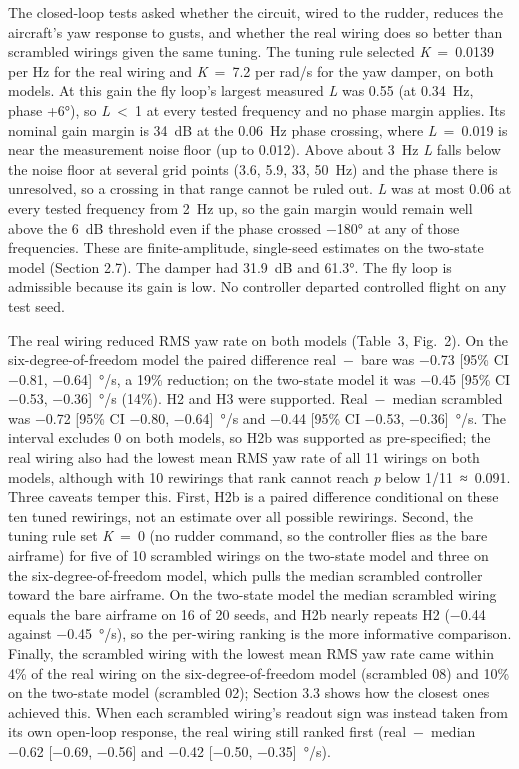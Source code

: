 \documentclass[11pt,letterpaper]{article}
\begin{document}
\noindent The closed-loop tests asked whether the circuit, wired to the
rudder, reduces the aircraft's yaw response to gusts, and whether the
real wiring does so better than scrambled wirings given the same tuning.
The tuning rule selected \emph{K}~=~0.0139 per Hz for the real wiring
and \emph{K}~=~7.2 per rad/s for the yaw damper, on both models. At this
gain the fly loop's largest measured \textbar{}\emph{L}\textbar{} was
0.55 (at 0.34~Hz, phase +6°), so \textbar{}\emph{L}\textbar~\textless~1
at every tested frequency and no phase margin applies. Its nominal gain
margin is 34~dB at the 0.06~Hz phase crossing, where
\textbar{}\emph{L}\textbar~=~0.019 is near the measurement noise floor
(up to 0.012). Above about 3~Hz \textbar{}\emph{L}\textbar{} falls below
the noise floor at several grid points (3.6, 5.9, 33, 50~Hz) and the
phase there is unresolved, so a crossing in that range cannot be ruled
out. \textbar{}\emph{L}\textbar{} was at most 0.06 at every tested
frequency from 2~Hz up, so the gain margin would remain well above the
6~dB threshold even if the phase crossed −180° at any of those
frequencies. These are finite-amplitude, single-seed estimates on the
two-state model (Section 2.7). The damper had 31.9~dB and 61.3°. The fly
loop is admissible because its gain is low. No controller departed
controlled flight on any test seed.

The real wiring reduced RMS yaw rate on both models (Table~3, Fig.~2).
On the six-degree-of-freedom model the paired difference real~−~bare was
−0.73 {[}95\% CI −0.81, −0.64{]}~°/s, a 19\% reduction; on the two-state
model it was −0.45 {[}95\% CI −0.53, −0.36{]}~°/s (14\%). H2 and H3 were
supported. Real~−~median scrambled was −0.72 {[}95\% CI −0.80,
−0.64{]}~°/s and −0.44 {[}95\% CI −0.53, −0.36{]}~°/s. The interval
excludes 0 on both models, so H2b was supported as pre-specified; the
real wiring also had the lowest mean RMS yaw rate of all 11 wirings on
both models, although with 10 rewirings that rank cannot reach \emph{p}
below 1/11~≈~0.091. Three caveats temper this. First, H2b is a paired
difference conditional on these ten tuned rewirings, not an estimate
over all possible rewirings. Second, the tuning rule set \emph{K}~=~0
(no rudder command, so the controller flies as the bare airframe) for
five of 10 scrambled wirings on the two-state model and three on the
six-degree-of-freedom model, which pulls the median scrambled controller
toward the bare airframe. On the two-state model the median scrambled
wiring equals the bare airframe on 16 of 20 seeds, and H2b nearly
repeats H2 (−0.44 against −0.45~°/s), so the per-wiring ranking is the
more informative comparison. Finally, the scrambled wiring with the
lowest mean RMS yaw rate came within 4\% of the real wiring on the
six-degree-of-freedom model (scrambled 08) and 10\% on the two-state
model (scrambled 02); Section 3.3 shows how the closest ones achieved
this. When each scrambled wiring's readout sign was instead taken from
its own open-loop response, the real wiring still ranked first
(real~−~median −0.62 {{[}−0.69, −0.56{]}} and −0.42 {{[}−0.50,
−0.35{]}}~°/s).
\end{document}
